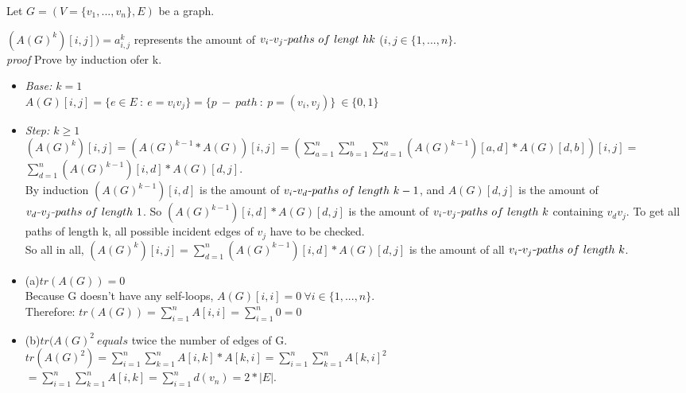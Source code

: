 \documentclass[a4paper]{article}
\newcommand{\unaryminus}{\scalebox{0.5}[1.0]{\( - \)}}
\begin{document}
		\begin{solution}{31}
		
		Let $G=(V=\{v_1,...,v_n\}, E)$ be a graph.
			
		\begin{mylemma}$(A(G)^k)[i,j])=a^k_{i,j}$ represents the amount of $v_i\unaryminus v_j \unaryminus paths ~of ~lengt~h k$ ($i,j \in \{1,...,n\}$.\\
		
			\emph{proof} Prove by induction ofer k.\\
			\begin{itemize}
				\item \emph{Base: $k=1$}\\
					$A(G)[i,j] =  \{e \in E ~ : ~ e=v_iv_j\} = \{p ~ - ~ path ~ : ~ p=(v_i,v_j)\} ~ \in \{0,1\}$
				\item \emph{Step: $k \ge 1$}\\
					$(A(G)^k)[i,j] = (A(G)^{k-1} * A(G))[i,j] = (\sum_{a=1}^{n}\sum_{b=1}^{n}\sum_{d=1}^{n}(A(G)^{k-1})[a,d] * A(G)[d,b])[i,j]=$\\
					$\sum_{d=1}^{n}(A(G)^{k-1})[i,d] * A(G)[d,j]$.\\
					By induction $(A(G)^{k-1})[i,d]$ is the amount of $v_i\unaryminus v_d\unaryminus paths~ of ~length~ k-1$, and $A(G)[d,j]$ is the amount of $v_d\unaryminus v_j\unaryminus paths~ of ~length ~1$. So $(A(G)^{k-1})[i,d] * A(G)[d,j]$ is the amount of $v_i\unaryminus v_j\unaryminus paths ~of ~length~ k$ containing $v_dv_j$. To get all paths of length k, all possible incident edges of $v_j$ have to be checked.\\
					So all in all, $(A(G)^k)[i,j] = \sum_{d=1}^{n}(A(G)^{k-1})[i,d] * A(G)[d,j]$ is the amount of all $v_i\unaryminus v_j \unaryminus paths~ of ~length ~k$.
			\end{itemize} 
		\end{mylemma}
				
			\begin{itemize}
				\item (a)$tr(A(G))=0$\\
					Because G doesn't have any self-loops, $A(G)[i,i] = 0 ~ \forall i \in \{1,...,n\}$.\\
					Therefore: $tr(A(G))=\sum_{i=1}^{n}A[i,i] = \sum_{i=1}^{n}0=0$
					\\
				\item (b)$tr(A(G)^2 ~equals$ twice the number of edges of G.\\
					$tr(A(G)^2) = \sum_{i=1}^{n}\sum_{k=1}^{n}A[i,k] * A[k,i]=\sum_{i=1}^{n}\sum_{k=1}^{n}A[k,i]^2$\\
					$=\sum_{i=1}^{n}\sum_{k=1}^{n}A[i,k]=\sum_{i=1}^{n}d(v_n)=2*|E|$.
					

\end{itemize}
\end{solution}
\end{document}

